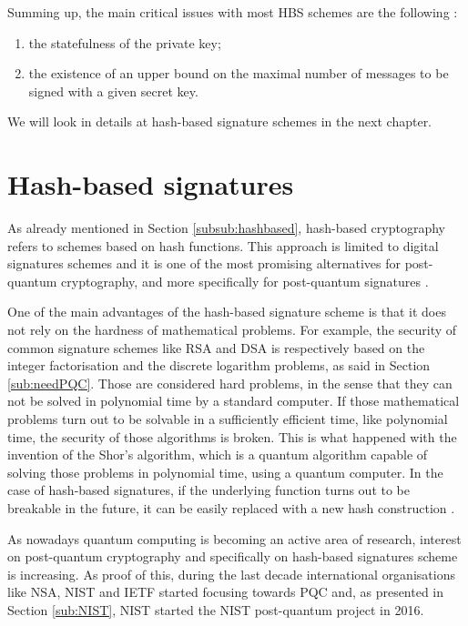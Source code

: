 \documentclass[a4paper,12pt]{article}
\begin{document}
Summing up, the main critical issues with most HBS schemes are the following \cite{9_postquantum_auth_openssl}:
\begin{enumerate}
	\item the statefulness of the private key;
	\item the existence of an upper bound on the maximal number of messages to be signed with a given secret key.
\end{enumerate}

We will look in details at hash-based signature schemes in the next chapter.

\section{Hash-based signatures}

As already mentioned in Section \ref{subsub:hashbased}, hash-based cryptography refers to schemes based on hash functions. This approach is limited to digital signatures schemes and it is one of the most promising alternatives for post-quantum cryptography, and more specifically for post-quantum signatures \cite{1_sphincspaper}\cite{9_postquantum_auth_openssl}.

One of the main advantages of the hash-based signature scheme is that it does not rely on the hardness of mathematical problems. For example, the security of common signature schemes like RSA and DSA is respectively based on the integer factorisation and the discrete logarithm problems, as said in Section \ref{sub:needPQC}. Those are considered hard problems, in the sense that they can not be solved in polynomial time by a standard computer. If those mathematical problems turn out to be solvable in a sufficiently efficient time, like polynomial time, the security of those algorithms is broken. This is what happened with the invention of the Shor's algorithm, which is a quantum algorithm capable of solving those problems in polynomial time, using a quantum computer.
In the case of hash-based signatures, if the underlying function turns out to be breakable in the future, it can be easily replaced with a new hash construction \cite{12_faultinjection}.

As nowadays quantum computing is becoming an active area of research, interest on post-quantum cryptography and specifically on hash-based signatures scheme is increasing. As proof of this, during the last decade international organisations like NSA, NIST and IETF started focusing towards PQC \cite{9_postquantum_auth_openssl} and, as presented in Section \ref{sub:NIST}, NIST started the NIST post-quantum project in 2016.
\end{document}

